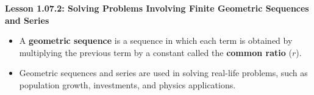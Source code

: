 \begin{center}
\textbf{Lesson 1.07.2: Solving Problems Involving Finite Geometric Sequences and Series}
\end{center}

\vspace*{-1.5ex}

\begin{itemize}
    \item A \textbf{geometric sequence} is a sequence in which each term is obtained by multiplying the previous term by a constant called the \textbf{common ratio} (\(r\)).
    \item Geometric sequences and series are used in solving real-life problems, such as population growth, investments, and physics applications.
\end{itemize}
